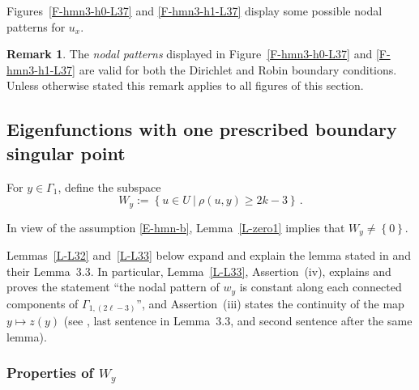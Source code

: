 \documentclass[12pt,a4paper]{amsart}
\theoremstyle{plain} %
\theoremstyle{definition}
\newtheorem{remark}[theorem]{Remark}
\numberwithin{equation}{section}
\numberwithin{figure}{section}
\numberwithin{table}{section}
\newcommand{\set}[1]{\left\lbrace #1 \right\rbrace}
\begin{document}
Figures~\ref{F-hmn3-h0-L37} and \ref{F-hmn3-h1-L37} display some possible nodal patterns for $u_x$.

\begin{remark}\label{R-Fgene2}
The \emph{nodal patterns} displayed in Figure~\ref{F-hmn3-h0-L37} and \ref{F-hmn3-h1-L37} are valid for both the Dirichlet and Robin boundary conditions. Unless otherwise stated this remark applies to all figures of this section.
\end{remark}


\subsection{Eigenfunctions with one prescribed boundary singular point}\label{SS-hmn-31b}\phantom{}

For $y \in \Gamma_1$, define the subspace
%
\begin{equation}\label{E-hmn3-n10a}
W_y := \set{u \in U ~|~ \rho(u,y) \ge 2k - 3}\,.
\end{equation}

In view of the assumption \eqref{E-hmn-b}, Lemma~\ref{L-zero1} implies that $W_y \neq \set{0}$. \smallskip

Lemmas~\ref{L-L32} and~\ref{L-L33} below expand and explain the lemma stated in \cite[\S3.2]{HoMN1999} and their Lemma~3.3. In particular, Lemma~\ref{L-L33}, Assertion~(iv), explains and proves the statement ``the nodal pattern of $w_y$ is constant along each connected components of $\Gamma_{1,(2\ell -3)}$'', and Assertion~(iii) states the continuity of the map $y \mapsto z(y)$ (see \cite[p.~1179]{HoMN1999}, last sentence in Lemma~3.3, and second sentence after the same lemma).

\subsubsection{Properties of $W_y$}\label{SSS-hmn-31ba}
\end{document}
